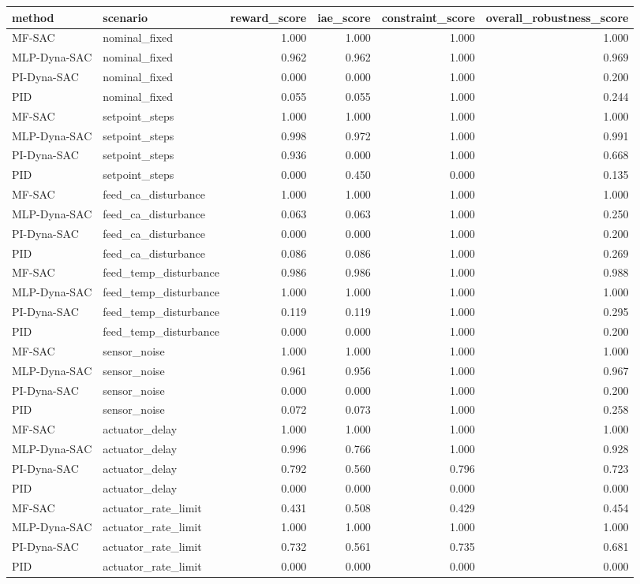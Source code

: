 \begin{tabular}{llrrrr}
\toprule
method & scenario & reward\_score & iae\_score & constraint\_score & overall\_robustness\_score \\
\midrule
MF-SAC & nominal\_fixed & 1.000 & 1.000 & 1.000 & 1.000 \\
MLP-Dyna-SAC & nominal\_fixed & 0.962 & 0.962 & 1.000 & 0.969 \\
PI-Dyna-SAC & nominal\_fixed & 0.000 & 0.000 & 1.000 & 0.200 \\
PID & nominal\_fixed & 0.055 & 0.055 & 1.000 & 0.244 \\
MF-SAC & setpoint\_steps & 1.000 & 1.000 & 1.000 & 1.000 \\
MLP-Dyna-SAC & setpoint\_steps & 0.998 & 0.972 & 1.000 & 0.991 \\
PI-Dyna-SAC & setpoint\_steps & 0.936 & 0.000 & 1.000 & 0.668 \\
PID & setpoint\_steps & 0.000 & 0.450 & 0.000 & 0.135 \\
MF-SAC & feed\_ca\_disturbance & 1.000 & 1.000 & 1.000 & 1.000 \\
MLP-Dyna-SAC & feed\_ca\_disturbance & 0.063 & 0.063 & 1.000 & 0.250 \\
PI-Dyna-SAC & feed\_ca\_disturbance & 0.000 & 0.000 & 1.000 & 0.200 \\
PID & feed\_ca\_disturbance & 0.086 & 0.086 & 1.000 & 0.269 \\
MF-SAC & feed\_temp\_disturbance & 0.986 & 0.986 & 1.000 & 0.988 \\
MLP-Dyna-SAC & feed\_temp\_disturbance & 1.000 & 1.000 & 1.000 & 1.000 \\
PI-Dyna-SAC & feed\_temp\_disturbance & 0.119 & 0.119 & 1.000 & 0.295 \\
PID & feed\_temp\_disturbance & 0.000 & 0.000 & 1.000 & 0.200 \\
MF-SAC & sensor\_noise & 1.000 & 1.000 & 1.000 & 1.000 \\
MLP-Dyna-SAC & sensor\_noise & 0.961 & 0.956 & 1.000 & 0.967 \\
PI-Dyna-SAC & sensor\_noise & 0.000 & 0.000 & 1.000 & 0.200 \\
PID & sensor\_noise & 0.072 & 0.073 & 1.000 & 0.258 \\
MF-SAC & actuator\_delay & 1.000 & 1.000 & 1.000 & 1.000 \\
MLP-Dyna-SAC & actuator\_delay & 0.996 & 0.766 & 1.000 & 0.928 \\
PI-Dyna-SAC & actuator\_delay & 0.792 & 0.560 & 0.796 & 0.723 \\
PID & actuator\_delay & 0.000 & 0.000 & 0.000 & 0.000 \\
MF-SAC & actuator\_rate\_limit & 0.431 & 0.508 & 0.429 & 0.454 \\
MLP-Dyna-SAC & actuator\_rate\_limit & 1.000 & 1.000 & 1.000 & 1.000 \\
PI-Dyna-SAC & actuator\_rate\_limit & 0.732 & 0.561 & 0.735 & 0.681 \\
PID & actuator\_rate\_limit & 0.000 & 0.000 & 0.000 & 0.000 \\
\bottomrule
\end{tabular}
